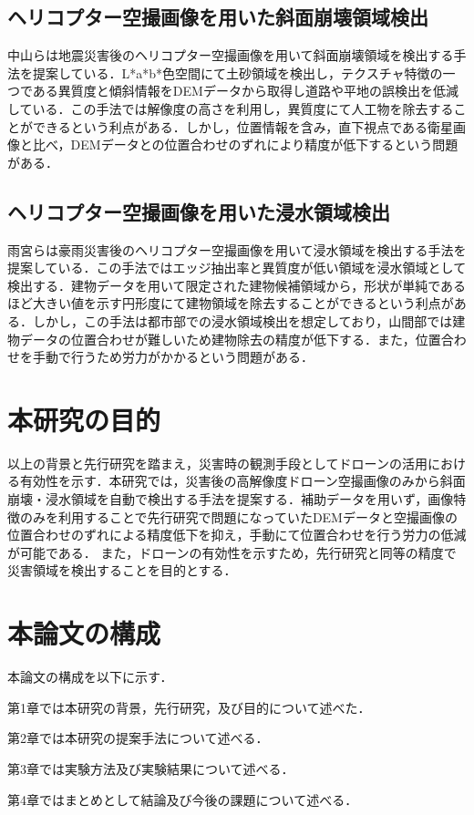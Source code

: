 \documentclass[../Thesis]{subfiles}
\begin{document}
\subsection{ヘリコプター空撮画像を用いた斜面崩壊領域検出}
  中山ら\cite{art03}は地震災害後のヘリコプター空撮画像を用いて斜面崩壊領域を検出する手法を提案している．L*a*b*色空間にて土砂領域を検出し，テクスチャ特徴の一つである異質度と傾斜情報をDEMデータから取得し道路や平地の誤検出を低減している．この手法では解像度の高さを利用し，異質度にて人工物を除去することができるという利点がある．しかし，位置情報を含み，直下視点である衛星画像と比べ，DEMデータとの位置合わせのずれにより精度が低下するという問題がある．

\subsection{ヘリコプター空撮画像を用いた浸水領域検出}
  雨宮ら\cite{art04}は豪雨災害後のヘリコプター空撮画像を用いて浸水領域を検出する手法を提案している．この手法ではエッジ抽出率と異質度が低い領域を浸水領域として検出する．建物データを用いて限定された建物候補領域から，形状が単純であるほど大きい値を示す円形度にて建物領域を除去することができるという利点がある．しかし，この手法は都市部での浸水領域検出を想定しており，山間部では建物データの位置合わせが難しいため建物除去の精度が低下する．また，位置合わせを手動で行うため労力がかかるという問題がある．


\section{本研究の目的} 
  以上の背景と先行研究を踏まえ，災害時の観測手段としてドローンの活用における有効性を示す．本研究では，災害後の高解像度ドローン空撮画像のみから斜面崩壊・浸水領域を自動で検出する手法を提案する．補助データを用いず，画像特徴のみを利用することで先行研究で問題になっていたDEMデータと空撮画像の位置合わせのずれによる精度低下を抑え，手動にて位置合わせを行う労力の低減が可能である． また，ドローンの有効性を示すため，先行研究と同等の精度で災害領域を検出することを目的とする．
  
  


\section{本論文の構成}
  \label{sec:本論文の構成}
  本論文の構成を以下に示す． \par
  第1章では本研究の背景，先行研究，及び目的について述べた．\par
  第2章では本研究の提案手法について述べる．\par
  第3章では実験方法及び実験結果について述べる．\par
  第4章ではまとめとして結論及び今後の課題について述べる．
\end{document}
